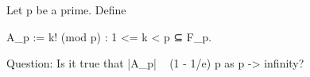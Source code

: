 Let p be a prime. Define

    A_p := { k! (mod p) : 1 <= k < p }  ⊆ F_p.

Question: Is it true that |A_p| ~ (1 - 1/e) p as p -> infinity?
